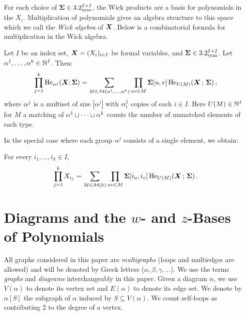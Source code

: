 For each choice of $\mathbf{\Sigma} \in 3.2^{I \times I}_{\mathrm{sym}}$,
the Wick products are a basis for polynomials in the $X_i$.
Multiplication of polynomials gives an algebra structure to this space
which we call the {\em Wick algebra} of ${\bm X}$.
Below is a combinatorial formula for multiplication in the Wick algebra.

\begin{proposition}
\label{prop:wick}
    Let $I$ be an index set, ${\bm X} = (X_i)_{i \in I}$ be formal variables, and $\mathbf{\Sigma} \in 3.2_{\mathrm{sym}}^{I \times I}$.
    Let $\alpha^1,\dots, \alpha^k \in \mathbb{N}^I$. Then:
    \begin{align*}
        \prod_{j=1}^k \operatorname{He}_{\alpha^j}({\bm X}; \mathbf{\Sigma}) = \sum_{M \in {\cal M}( \alpha^1, \dots,  \alpha^k)} \prod_{uv \in M} \mathbf{\Sigma}[u, v] \operatorname{He}_{U(M)}({\bm X}\,;\, \mathbf{\Sigma})\,,
    \end{align*}
     where $\alpha^j$ is a multiset of size $|\alpha^j|$ with $\alpha^j_{i}$ copies of each $i \in I$.
     Here $U(M) \in \mathbb{N}^I$ for $M$ a matching of $\alpha^1 \sqcup \cdots \sqcup \alpha^k$ counts the number of unmatched elements of each type.
\end{proposition}

\noindent In the special case where each
group $\alpha^j$ consists of a
single element, we obtain:

\begin{corollary}\label{lem:wick-recursion}
    For every $i_1, \ldots, i_k\in I$,
    \[
        \prod_{j=1}^k X_{i_j} = \sum_{M\in {\cal M}(k)} \prod_{uv\in M} \bm \Sigma[i_u,i_v] \operatorname{He}_{U(M)}(\bm X\,;\,\bm \Sigma)\,.
    \]
\end{corollary}

\section{Diagrams and the \texorpdfstring{$w$- and $z$-Bases}{w- and z-Bases} of Polynomials}
\label{sec:diagrams}

All graphs considered in this paper are {\em multigraphs} (loops and multiedges are allowed) and will be
denoted by Greek letters ($\alpha, \beta, \gamma,\ldots$). 
We use the terms {\em graphs} and {\em diagrams}
interchangeably in this paper.
Given a diagram $\alpha$, we use $V(\alpha)$
to denote its vertex set and $E(\alpha)$ to denote
its edge set. We 
denote by $\alpha[S]$ the subgraph of $\alpha$
induced by $S\subseteq V(\alpha)$.
We count self-loops as contributing 2 to the degree of a vertex.

